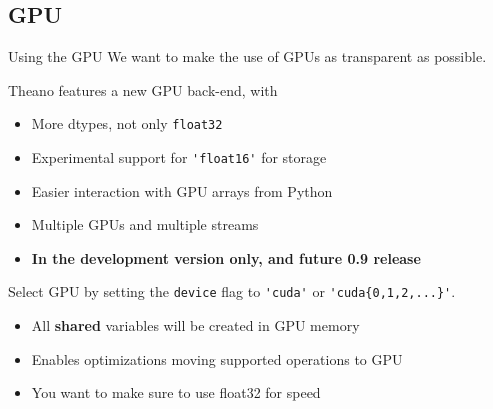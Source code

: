 \documentclass[a4paper,9pt]{beamer}
\begin{document}

\subsection{GPU}
\begin{frame}[fragile]{Using the GPU}
  We want to make the use of GPUs as transparent as possible.

  Theano features a new GPU back-end, with
  \begin{itemize}
    \item More dtypes, not only \verb|float32|
    \item Experimental support for \verb|'float16'| for storage
    \item Easier interaction with GPU arrays from Python
    \item Multiple GPUs and multiple streams
    \item \textbf{In the development version only, and future 0.9 release}
  \end{itemize}

  Select GPU by setting the \verb|device| flag to \verb|'cuda'| or \verb|'cuda{0,1,2,...}'|.
  \begin{itemize}
    \item All {\bf shared} variables will be created in GPU memory
    \item Enables optimizations moving supported operations to GPU
    \item You want to make sure to use float32 for speed
  \end{itemize}
\end{frame}
\end{document}
